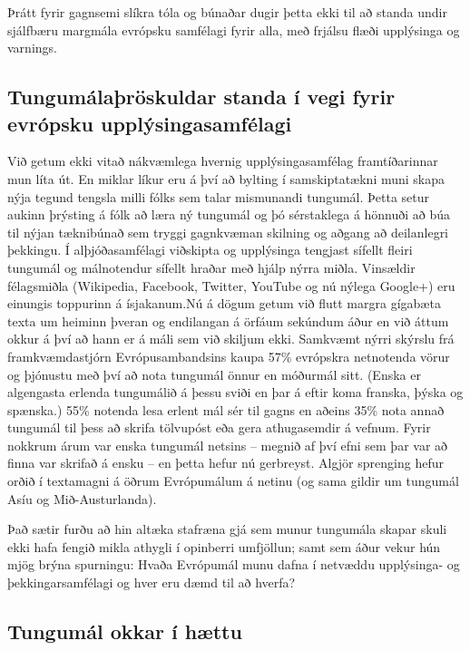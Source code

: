 \documentclass{../../metanetpaper}
\begin{document}
\begin{multicols}{2}
Þrátt fyrir gagnsemi slíkra tóla og búnaðar dugir þetta ekki til að standa undir sjálfbæru margmála evrópsku samfélagi fyrir alla, með frjálsu flæði upplýsinga og varnings.

\subsection{Tungumálaþröskuldar standa í vegi fyrir evrópsku upplýsingasamfélagi}
  
Við getum ekki vitað nákvæmlega hvernig upplýsingasamfélag framtíðarinnar mun líta út. En miklar líkur eru á því að bylting í samskiptatækni muni skapa nýja tegund tengsla milli fólks sem talar mismunandi tungumál. Þetta setur aukinn þrýsting á fólk að læra ný tungumál og þó sérstaklega á hönnuði að búa til nýjan tæknibúnað sem tryggi gagnkvæman skilning og aðgang að deilanlegri þekkingu. Í alþjóðasamfélagi viðskipta og upplýsinga tengjast sífellt fleiri tungumál og málnotendur sífellt hraðar með hjálp nýrra miðla. Vinsældir félagsmiðla (Wikipedia, Facebook, Twitter, YouTube og nú nýlega Google+) eru einungis toppurinn á ísjakanum.Nú á dögum getum við flutt margra gígabæta texta um heiminn þveran og endilangan á örfáum sekúndum áður en við áttum okkur á því að hann er á máli sem við skiljum ekki. Samkvæmt nýrri skýrslu frá framkvæmdastjórn Evrópusambandsins kaupa 57\% evrópskra netnotenda vörur og þjónustu með því að nota tungumál önnur en móðurmál sitt. (Enska er algengasta erlenda tungumálið á þessu sviði en þar á eftir koma franska, þýska og spænska.) 55\% notenda lesa erlent mál sér til gagns en aðeins 35\% nota annað tungumál til þess að skrifa tölvupóst eða gera athugasemdir á vefnum\cite{EC1}. Fyrir nokkrum árum var enska tungumál netsins -- megnið af því efni sem þar var að finna var skrifað á ensku -- en þetta hefur nú gerbreyst. Algjör sprenging hefur orðið í textamagni á öðrum Evrópumálum á netinu (og sama gildir um tungumál Asíu og Mið-Austurlanda). 

Það sætir furðu að hin altæka stafræna gjá sem munur tungumála skapar skuli ekki hafa fengið mikla athygli í opinberri umfjöllun; samt sem áður vekur hún mjög brýna spurningu: Hvaða Evrópumál munu dafna í netvæddu upplýsinga- og þekkingarsamfélagi og hver eru dæmd til að hverfa?

\subsection{Tungumál okkar í hættu}


\end{multicols}
\end{document}
